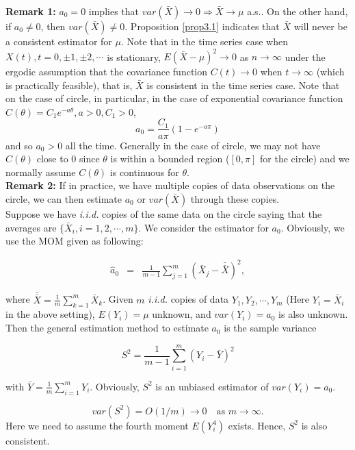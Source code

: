 {\bf Remark 1:} $a_0 = 0$ implies that $var(\bar{X}) \to 0 \Rightarrow \bar{X} \to \mu$ a.s.. On the other hand, if $a_0 \ne 0$, then $var(\bar{X}) \ne 0$. Proposition \ref{prop3.1} indicates that $\bar{X}$ will never be a consistent estimator for $\mu$. Note that in the time series case when $X(t), t = 0, \pm 1, \pm 2, \cdots$ is stationary, $E(\bar{X} - \mu)^2 \to 0$ as $n \to \infty$ under the ergodic assumption that the covariance function $C(t) \to 0$ when $t \to \infty$ (which is practically feasible), that is, $\bar{X}$ is consistent in the time series case. Note that on the case of circle, in particular, in the case of exponential covariance function $C(\theta) = C_1 e^{-a\theta}, a > 0, C_1 >0$,
\[
a_0 = \frac{C_1}{a\pi}(1 - e^{-a\pi})
\]
and so $a_0 > 0$ all the time. Generally in the case of circle, we may not have $C(\theta)$ close to 0 since $\theta$ is within a bounded region ($[0, \pi]$ for the circle) and we normally assume $C(\theta)$ is continuous for $\theta$. \\

{\bf Remark 2:} If in practice, we have multiple copies of data observations on the circle, we can then estimate $a_0$ or $var(\bar{X})$ through these copies. \\

Suppose we have {\em i.i.d.} copies of the same data on the circle saying that the averages are $\{\bar{X}_i, i = 1, 2, \cdots, m\}$. We consider the estimator for $a_0$. Obviously, we use the MOM given as following:

\begin{eqnarray*}
\hat{a}_0 &=& \frac{1}{m-1} \sum_{j=1}^m (\bar{X}_j - \bar{\bar{X}})^2,
\end{eqnarray*}

where $\bar{\bar{X}} = \frac{1}{m} \sum_{k = 1}^m \bar{X}_k$. Given $m$ {\em i.i.d.} copies of data $Y_1, Y_2, \cdots, Y_m$ (Here $Y_i = \bar{X}_i$ in the above setting), $E(Y_i) = \mu$ unknown, and $var(Y_i) = a_0$ is also unknown. Then the general estimation method to estimate $a_0$ is the sample variance

\[
S^2 = \frac{1}{m-1} \sum_{i=1}^m (Y_i - \bar{Y})^2
\]

with $\bar{Y} = \frac{1}{m} \sum_{i=1}^m Y_i$. Obviously, $S^2$ is an unbiased estimator of $var(Y_i) = a_0$. 

\[
var(S^2) = O(1/m)  \to 0 \quad \mbox{as $m \to \infty$.}
\]
Here we need to assume the fourth moment $E(Y_i^4)$ exists. Hence, $S^2$ is also consistent. \\

